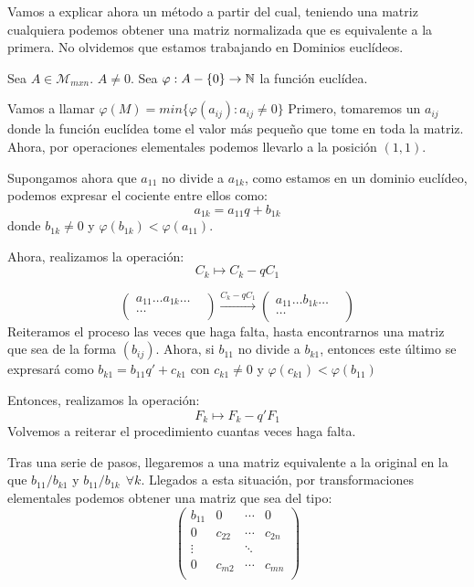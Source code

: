 Vamos a explicar ahora un método a partir del cual, teniendo una matriz cualquiera podemos obtener una matriz normalizada que es equivalente a la primera. No olvidemos que estamos trabajando en Dominios euclídeos.

Sea $A \in \mathcal{M}_{mxn}$. $A \ne 0$. Sea $\varphi:A -\{0\} \to \mathbb{N}$ la función euclídea.

Vamos a llamar $\varphi(M) = min\{\varphi(a_{ij}) : a_{ij} \ne 0\}$
Primero, tomaremos un $a_{ij}$ donde la función euclídea tome el valor más pequeño que tome en toda la matriz. Ahora, por operaciones elementales podemos llevarlo a la posición $(1,1)$.

Supongamos ahora que $a_{11}$ no divide a $a_{1k}$, como estamos en un dominio euclídeo, podemos expresar el cociente entre ellos como:
\[
a_{1k} = a_{11}q+ b_{1k}
\]
donde $b_{1k} \ne 0$ y $\varphi(b_{1k}) < \varphi(a_{11})$.

Ahora, realizamos la operación:
\[
C_k \mapsto C_k - q C_1
\]

		\[ \begin{pmatrix}
			 a_{11} \hdots  a_{1k} \hdots \\
			   \hdots &  \\
		\end{pmatrix}
		\xrightarrow{C_k - qC_1}
		\begin{pmatrix}
			 a_{11} \hdots  b_{1k} \hdots \\
			   \hdots &  \\
		\end{pmatrix}
\]
Reiteramos el proceso las veces que haga falta, hasta encontrarnos una matriz que sea de la forma $(b_{ij})$. Ahora, si $b_{11}$ no divide a $b_{k1}$, entonces este último se expresará como $b_{k1} = b_{11}q' + c_{k1}$ con $c_{k1}\ne 0$ y $\varphi(c_{k1}) < \varphi(b_{11})$

Entonces, realizamos la operación:
\[
F_k \mapsto F_k - q'F_1
\]
Volvemos a reiterar el procedimiento cuantas veces haga falta.

Tras una serie de pasos, llegaremos a una matriz equivalente a la original en la que $b_{11}/b_{k1}$ y $b_{11}/b_{1k} \ \ \forall k$. Llegados a esta situación, por transformaciones elementales podemos obtener una matriz que sea del tipo:
\[
\begin{pmatrix}
 b_{11} & 0 & \cdots & 0 \\
 0 & c_{22} & \cdots & c_{2n} \\
 \vdots &  & \ddots& \\
 0 & c_{m2} & \cdots & c_{mn} \\
\end{pmatrix}
\]


